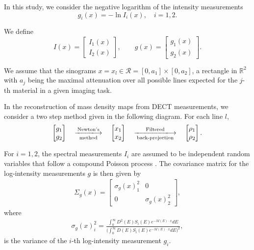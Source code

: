 \documentclass[12pt,twoside]{article}   %
\def\R{\mathbb{R}}
\def\rR{\mathcal{R}}
\def\s{\sigma}
\begin{document}
In this study, we consider the negative logarithm of the intensity measurements
\begin{equation}\label{eq:g}
  g_i(x) = - \ln I_i(x), \quad i=1,2.
\end{equation}

We define 
\[
I(x) =
\begin{bmatrix}
I_1(x)\\
I_2(x)
\end{bmatrix}, \qquad
g(x) =
\begin{bmatrix}
g_1(x)\\
g_2(x)
\end{bmatrix}.
\]

We assume that the sinograms $x=x_l\in \rR=[0,a_1] \times [0,a_2]$, a rectangle in $\R^2$ with $a_j$ being the maximal attenuation over all possible lines expected for the $j$-th material in a given imaging task.

In the reconstruction of mass density maps from DECT measurements, we consider a two step method given in the following diagram. For each line $l$,
\begin{align}
\begin{bmatrix}
 g_1\\ 
 g_2
\end{bmatrix}
\quad \xlongrightarrow[\text{method}]{\text{Newton's}} \quad
\begin{bmatrix}
 x_1\\
 x_2
\end{bmatrix}
\quad \xlongrightarrow[\text{back-projection}]{\text{Filtered}} \quad
\begin{bmatrix}
 \rho_1\\
 \rho_2
\end{bmatrix}.
\end{align}

For $i=1,2$, the spectral measurements $I_i$ are assumed to be independent random variables that follow a compound Poisson process \cite{Whiting2002}. The covariance matrix for the log-intensity measurements $g$ is then given by
\begin{align}
\Sigma_g(x) = 
\begin{bmatrix}
\s_g(x)_1^2 & 0\\
0 & \s_g(x)_2^2
\end{bmatrix},
\end{align}
where 
\begin{align}\label{noise}
  \s_g(x)_i^2 = \displaystyle \frac{\int_0^\infty  D^2(E) S_i(E) e^{-M(E)\cdot x}dE}{\Big(\int_0^\infty  D(E) S_i(E) e^{-M(E)\cdot x}dE\Big)^2},
\end{align}
is the variance of the $i$-th log-intensity measurement $g_i$. 
\end{document}
